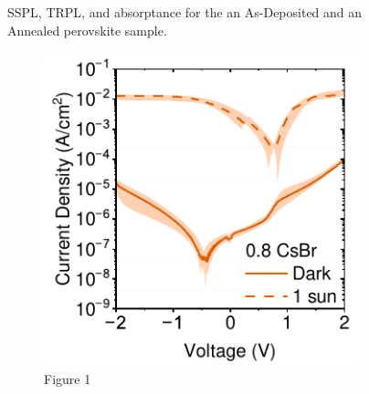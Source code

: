 \begin{figure}[htbp]
\begin{subfigure}[t]{0.45\textwidth}
        \caption{}
        \label{fig:ch2:box_plot_evap_rate}
    \end{subfigure}
    \caption{SSPL, TRPL, and absorptance for the an As-Deposited and an Annealed perovskite sample.}
\end{figure}




\begin{figure}[htbp]
    \centering

    \begin{subfigure}[b]{0.3\textwidth}
        \centering
        \includegraphics[width=\textwidth]{chapters/material_properties/images/08CsBr.pdf}
        \caption{Figure 1}
    \end{subfigure}
    \hfill
    \begin{subfigure}[b]{0.3\textwidth}
        \centering

\end{subfigure}
\end{figure}
